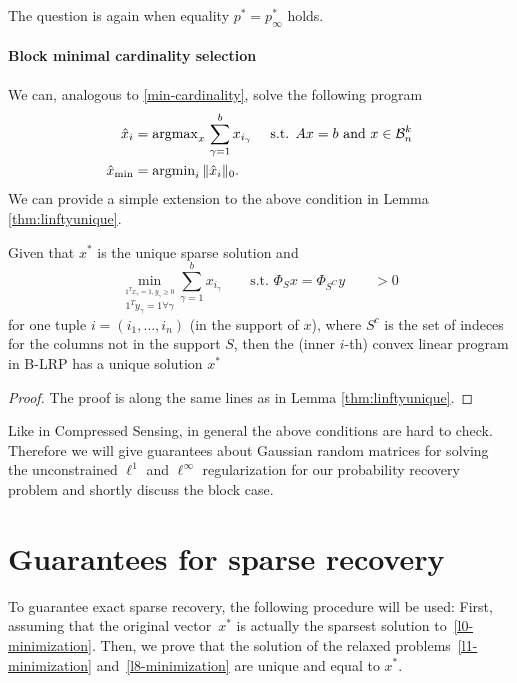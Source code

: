 \documentclass{article} %
\begin{document}
The question is again when equality $p^* = p^*_{\infty}$ holds. 

\paragraph{Block minimal cardinality selection}
We can, analogous to \eqref{min-cardinality}, solve the following program
\begin{align}
\hat{x}_i &=  \operatorname{argmax}\limits_{x}\, \sum_{\gamma=1}^b x_{i_\gamma} \quad \text{ s.t. } Ax = b \text{ and } x\in \mathcal B_n^k \label{block-min-cardinality}\\
\hat{x}_{\min} &= \operatorname{argmin}\limits_{i} \|\hat{x}_i\|_0. \nonumber
\end{align}
We can provide a simple extension to the above condition in Lemma \ref{thm:linftyunique}.
\begin{lemma} \label{thm:linftyunique_block}
Given that $x^*$ is the unique sparse solution and 
\begin{equation*}
\min_{\overset{1^Tx_{\gamma} = 1, y_{\gamma} \geq 0}{1^Ty_{\gamma} =1 \forall \gamma}} \sum_{\gamma =1}^b x_{i_{\gamma}} \qquad \text{s.t. } \Phi_S x = \Phi_{S^C} y \qquad>0
\end{equation*}
for one tuple $i = (i_1, \dots, i_n)$ (in the support of $x$), where $S^c$ is the set of indeces for the columns not in the support $S$, then the (inner $i$-th) convex linear program in B-LRP has a unique solution $x^*$
\end{lemma}
\begin{proof}
The proof is along the same lines as in Lemma \ref{thm:linftyunique}.
\end{proof}

Like in Compressed Sensing, in general the above conditions are hard to check. Therefore we will give guarantees about Gaussian random matrices for solving the unconstrained $\ell^1$ and $\ell^\infty$ regularization for our probability recovery problem and shortly discuss the block case.

\section{Guarantees for sparse recovery}
To guarantee exact sparse recovery, the following procedure will be used: First, assuming that the original vector~$x^*$ is actually the sparsest solution to~\eqref{l0-minimization}. Then, we prove that the solution of the relaxed problems~\eqref{l1-minimization} and~\eqref{l8-minimization} are unique and equal to $x^*$.
\end{document}
